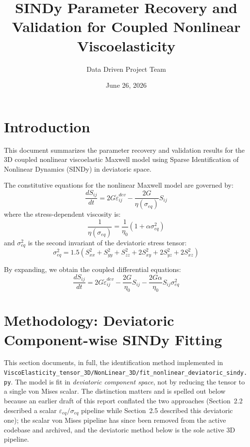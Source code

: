 \documentclass{article}
\title{SINDy Parameter Recovery and Validation for Coupled Nonlinear Viscoelasticity}
\author{Data Driven Project Team}
\date{June 26, 2026}
\begin{document}
\maketitle

\section{Introduction}
This document summarizes the parameter recovery and validation results for the 3D coupled nonlinear viscoelastic Maxwell model using Sparse Identification of Nonlinear Dynamics (SINDy) in deviatoric space. 

The constitutive equations for the nonlinear Maxwell model are governed by:
\begin{equation}
    \frac{d S_{ij}}{dt} = 2G \dot{\varepsilon}^{dev}_{ij} - \frac{2G}{\eta(\sigma_{eq})} S_{ij}
\end{equation}
where the stress-dependent viscosity is:
\begin{equation}
    \frac{1}{\eta(\sigma_{eq})} = \frac{1}{\eta_0} (1 + \alpha \sigma_{eq}^2)
\end{equation}
and $\sigma_{eq}^2$ is the second invariant of the deviatoric stress tensor:
\begin{equation}
    \sigma_{eq}^2 = 1.5 \left( S_{xx}^2 + S_{yy}^2 + S_{zz}^2 + 2 S_{xy}^2 + 2 S_{yz}^2 + 2 S_{xz}^2 \right)
\end{equation}

By expanding, we obtain the coupled differential equations:
\begin{equation}
    \frac{d S_{ij}}{dt} = 2G \dot{\varepsilon}^{dev}_{ij} - \frac{2G}{\eta_0} S_{ij} - \frac{2G\alpha}{\eta_0} S_{ij} \sigma_{eq}^2
\end{equation}

\section{Methodology: Deviatoric Component-wise SINDy Fitting}
\label{sec:methodology}
This section documents, in full, the identification method implemented in \texttt{ViscoElasticity\_tensor\_3D/NonLinear\_3D/fit\_nonlinear\_deviatoric\_sindy.py}. The model is fit in \emph{deviatoric component space}, not by reducing the tensor to a single von Mises scalar. The distinction matters and is spelled out below because an earlier draft of this report conflated the two approaches (Section~2.2 described a scalar $\varepsilon_{eq}/\sigma_{eq}$ pipeline while Section~2.5 described this deviatoric one); the scalar von Mises pipeline has since been removed from the active codebase and archived, and the deviatoric method below is the sole active 3D pipeline.
\end{document}
